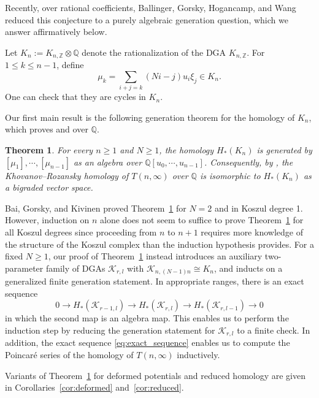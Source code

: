 \documentclass[reqno]{amsart}
\newtheorem{thm}{Theorem}[section]
\theoremstyle{definition}
\theoremstyle{remark}
\newcommand{\Z}{\mathbb Z}
\newcommand{\QQ}{\mathbb{Q}}
\newcommand{\cak}{\mathcal{K}}
\begin{document}
Recently, over rational coefficients, Ballinger, Gorsky, Hogancamp, and Wang \cite[Theorem~1.1 and Remark~1.4]{ballinger2025stable} reduced this conjecture to a purely algebraic generation question, which we answer affirmatively below.

Let $K_n:=K_{n,\Z}\otimes\QQ$ denote the rationalization of the DGA $K_{n,\Z}$. For $1\le k\le n-1$, define \[\mu_k=\sum_{i+j=k}(Ni-j)u_i\xi_j\in K_n.\] One can check that they are cycles in $K_n$.

Our first main result is the following generation theorem for the homology of $K_n$, which proves \cite[Conjecture~1.1]{gorsky2013stable} and \cite[Conjecture~1]{gorsky2015stable} over $\QQ$.

\begin{thm}\label{thm:Koszul generation}
For every $n\ge1$ and $N\ge1$, the homology $H_*(K_n)$ is generated by $[\mu_1],\cdots,[\mu_{n-1}]$ as an algebra over $\QQ[u_0,\cdots,u_{n-1}]$. Consequently, by \cite[Theorem~1.1 and Section~7.1]{ballinger2025stable}, the Khovanov--Rozansky homology of $T(n,\infty)$ over $\QQ$ is isomorphic to $H_*(K_n)$ as a bigraded vector space.
\end{thm}

Bai, Gorsky, and Kivinen \cite{bai2020quadratic} proved Theorem~\ref{thm:Koszul generation} for $N=2$ and in Koszul degree 1. However, induction on $n$ alone does not seem to suffice to prove Theorem~\ref{thm:Koszul generation} for all Koszul degrees since proceeding from $n$ to $n+1$ requires more knowledge of the structure of the Koszul complex than the induction hypothesis provides. For a fixed $N\ge1$, our proof of Theorem~\ref{thm:Koszul generation} instead introduces an auxiliary two-parameter family of DGAs $\mathcal K_{r,l}$ with $\cak_{n,(N-1)n}\cong K_n$, and inducts on a generalized finite generation statement. In appropriate ranges, there is an exact sequence
\begin{equation}\label{eq:exact_sequence}
0\to H_*(\mathcal K_{r-1,l})\to H_*(\mathcal K_{r,l})\to H_*(\mathcal K_{r,l-1})\to0
\end{equation}
in which the second map is an algebra map. This enables us to perform the induction step by reducing the generation statement for $\mathcal K_{r,l}$ to a finite check. In addition, the exact sequence \eqref{eq:exact_sequence} enables us to compute the Poincar\'e series of the homology of $T(n,\infty)$ inductively.

Variants of Theorem~\ref{thm:Koszul generation} for deformed potentials and reduced homology are given in Corollaries~\ref{cor:deformed} and~\ref{cor:reduced}.
\end{document}
